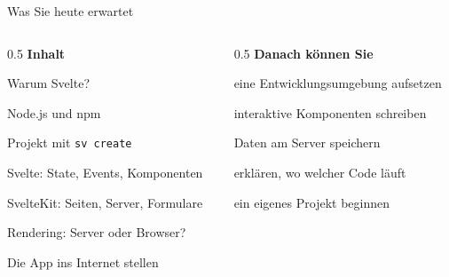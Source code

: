\begin{frame}{Was Sie heute erwartet}
  \begin{columns}[onlytextwidth,t]
    \begin{column}{0.5\textwidth}
      \textbf{Inhalt}
      \begin{tugitemize}
        \item Warum Svelte?
        \item Node.js und npm
        \item Projekt mit \texttt{sv create}
        \item Svelte: State, Events, Komponenten
        \item SvelteKit: Seiten, Server, Formulare
        \item Rendering: Server oder Browser?
        \item Die App ins Internet stellen
      \end{tugitemize}
    \end{column}
    \begin{column}{0.5\textwidth}
      \textbf{Danach können Sie}
      \begin{tugitemize}
        \item[\itemPlus] eine Entwicklungsumgebung aufsetzen
        \item[\itemPlus] interaktive Komponenten schreiben
        \item[\itemPlus] Daten am Server speichern
        \item[\itemPlus] erklären, wo welcher Code läuft
        \item[\itemArrow] ein eigenes Projekt beginnen
      \end{tugitemize}
    \end{column}
  \end{columns}
\end{frame}


